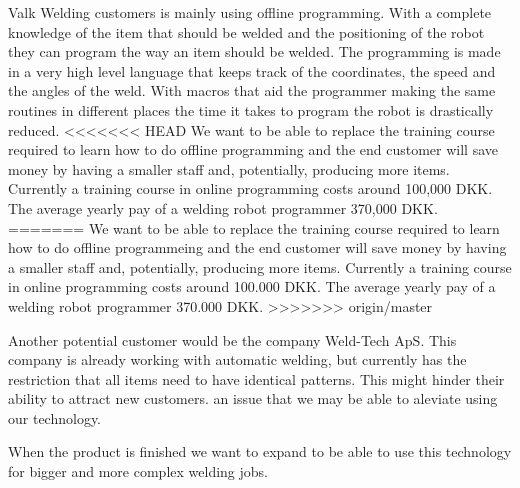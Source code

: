 Valk Welding customers is mainly using offline programming.
With a complete knowledge of the item that should be welded and the positioning of the robot they can program the way an item should be welded.
The programming is made in a very high level language that keeps track of the coordinates, the speed and the angles of the weld.
With macros that aid the programmer making the same routines in different places the time it takes to program the robot is drastically reduced.
<<<<<<< HEAD
We want to be able to replace the training course required to learn how to do offline programming and the end customer will save money by having a smaller staff and, potentially, producing more items. 
Currently a training course in online programming costs around 100,000 DKK\cite{valk_welding_summary}. 
The average yearly pay of a welding robot programmer 370,000 DKK\cite{welding_salary}. 
=======
We want to be able to replace the training course required to learn how to do offline programmeing and the end customer will save money by having a smaller staff and, potentially, producing more items. 
Currently a training course in online programming costs around 100.000 DKK\cite{valk_welding_summary}. 
The average yearly pay of a welding robot programmer 370.000 DKK\cite{welding_salary}. 
>>>>>>> origin/master

Another potential customer would be the company Weld-Tech ApS. 
This company is already working with automatic welding, but currently has the restriction that all items need to have identical patterns. 
This might hinder their ability to attract new customers. an issue that we may be able to aleviate using our technology.

When the product is finished we want to expand to be able to use this technology for bigger and more complex welding jobs.

